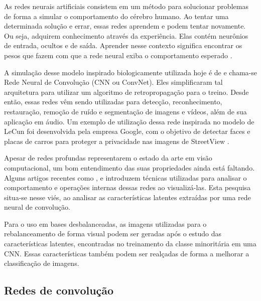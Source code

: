 As redes neurais artificiais consistem em um método para solucionar problemas de forma a simular o comportamento do cérebro humano. Ao tentar uma determinada solução e errar, essas redes aprendem e podem tentar novamente. Ou seja, adquirem conhecimento através da experiência. Elas contém neurônios de entrada, ocultos e de saída. Aprender nesse contexto significa encontrar os pesos que fazem com que a rede neural exiba o comportamento esperado \cite{Schmidhuber2014}.


A simulação desse modelo inspirado biologicamente utilizada hoje é de  e chama-se Rede Neural de Convolução (CNN ou ConvNet). Eles simplificaram tal arquitetura para utilizar um algoritmo de retropropagação para o treino. Desde então, essas redes vêm sendo utilizadas para detecção, reconhecimento, restauração, remoção de ruído e segmentação de imagens e vídeos, além de sua aplicação em áudio. Um exemplo de utilização dessa rede inspirada no modelo de LeCun foi desenvolvida pela empresa Google, com o objetivo de detectar faces e placas de carros para proteger a privacidade nas imagens de StreetView \cite{google09}.


Apesar de redes profundas representarem o estado da arte em visão computacional, um bom entendimento das suas propriedades ainda está faltando. Alguns artigos recentes como ,   e  introduzem técnicas utilizadas para analisar o comportamento e operações internas dessas redes ao visualizá-las. Esta pesquisa situa-se nesse viés, ao analisar as características latentes extraídas por uma rede neural de convolução.

Para o uso em bases desbalanceadas, as imagens utilizadas para o rebalanceamento de forma visual podem ser geradas após o estudo das características latentes, encontradas no treinamento da classe minoritária em uma CNN. Essas características também podem ser realçadas de forma a melhorar a classificação de imagens.

\subsection{Redes de convolução}

